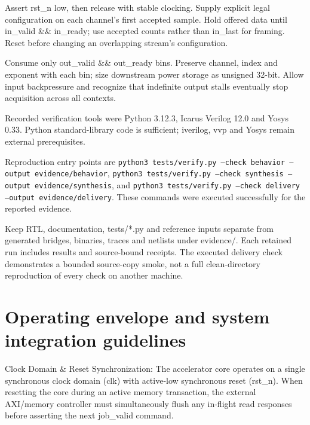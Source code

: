 \documentclass[11pt,a4paper]{article}
\begin{document}
Assert rst\_\allowbreak{}n low,\allowbreak{} then release with stable clocking. Supply explicit legal configuration on each channel's first accepted sample. Hold offered data until in\_\allowbreak{}valid \&\& in\_\allowbreak{}ready; use accepted counts rather than in\_\allowbreak{}last for framing. Reset before changing an overlapping stream's configuration.


Consume only out\_\allowbreak{}valid \&\& out\_\allowbreak{}ready bins. Preserve channel,\allowbreak{} index and exponent with each bin; size downstream power storage as unsigned 32-bit. Allow input backpressure and recognize that indefinite output stalls eventually stop acquisition across all contexts.


Recorded verification tools were Python 3.12.3,\allowbreak{} Icarus Verilog 12.0 and Yosys 0.33. Python standard-library code is sufficient; iverilog,\allowbreak{} vvp and Yosys remain external prerequisites.


Reproduction entry points are \texttt{python3 tests/\allowbreak{}verify.py --check behavior --output evidence/\allowbreak{}behavior},\allowbreak{} \texttt{python3 tests/\allowbreak{}verify.py --check synthesis --output evidence/\allowbreak{}synthesis},\allowbreak{} and \texttt{python3 tests/\allowbreak{}verify.py --check delivery --output evidence/\allowbreak{}delivery}. These commands were executed successfully for the reported evidence.


Keep RTL,\allowbreak{} documentation,\allowbreak{} tests/\allowbreak{}*\allowbreak{}.py and reference inputs separate from generated bridges,\allowbreak{} binaries,\allowbreak{} traces and netlists under evidence/\allowbreak{}. Each retained run includes results and source-bound receipts. The executed delivery check demonstrates a bounded source-copy smoke,\allowbreak{} not a full clean-directory reproduction of every check on another machine.


\section{Operating envelope and system integration guidelines}

Clock Domain \& Reset Synchronization: The accelerator core operates on a single synchronous clock domain (\allowbreak{}clk)\allowbreak{} with active-low synchronous reset (\allowbreak{}rst\_\allowbreak{}n)\allowbreak{}. When resetting the core during an active memory transaction,\allowbreak{} the external AXI/\allowbreak{}memory controller must simultaneously flush any in-flight read responses before asserting the next job\_\allowbreak{}valid command.
\end{document}
